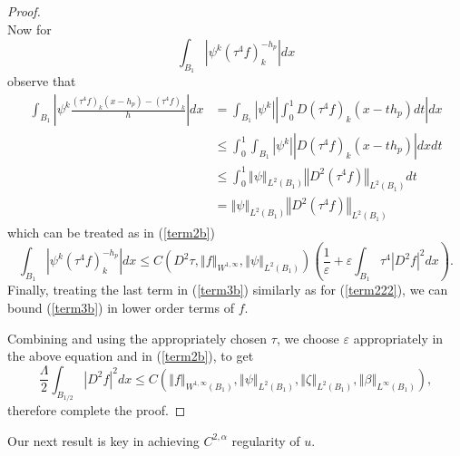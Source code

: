 \documentclass[12pt,leqno]{amsart}%
\theoremstyle{plain}
\numberwithin{equation}{section}
\theoremstyle{definition}
\begin{document}
\begin{proof}
\begin{equation}
\end{equation}
Now for
\begin{equation}
\int_{B_{1}}\left\vert \psi^{k} \left(  \tau^{4}f\right)  _{k}^{-h_{p}%
}\right\vert dx \label{term222}%
\end{equation}
observe that
\begin{align*}
\int_{B_{1}}\left|  \psi^{k}\frac{\left(  \tau^{4}f\right)  _{k}%
(x-h_{p})-\left(  \tau^{4}f\right)  _{k}}{h}\right|  dx  &  =\int_{B_{1}%
}\left|  \psi^{k}\right|  \left|  \int_{0}^{1}D\left(  \tau^{4}f\right)
_{k}(x-th_{p})dt\right|  dx\\
&  \leq\int_{0}^{1}\int_{B_{1}}\left|  \psi^{k}\right|  \left|  D \left(
\tau^{4}f\right)  _{k} (x-th_{p})\right|  dxdt\\
&  \leq\int_{0}^{1}\left\Vert \psi\right\Vert _{L^{2}(B_{1})}\left\Vert
D^{2}\left(  \tau^{4}f\right)  \right\Vert _{L^{2}(B_{1})}dt\\
&  =\left\Vert \psi\right\Vert _{L^{2}(B_{1})}\left\Vert D^{2}\left(  \tau
^{4}f\right)  \right\Vert _{L^{2}(B_{1})}%
\end{align*}
which can be treated as in (\ref{term2b})%
\[
\int_{B_{1}}\left\vert \psi^{k} \left(  \tau^{4}f\right)  _{k}^{-h_{p}%
}\right\vert dx\leq C\left(  D^{2}\tau,\left\Vert f\right\Vert _{W^{1,\infty}%
},\left\Vert \psi\right\Vert _{L^{2}(B_{1})}\right)  \left(  \frac
{1}{\varepsilon}+\varepsilon\int_{B_{1}}\tau^{4}\left\vert D^{2}f\right\vert
^{2}dx\right)  .
\]
Finally, treating the last term in (\ref{term3b}) similarly as for
(\ref{term222}), we can bound (\ref{term3b}) in lower order terms of $f.$

Combining and using the appropriately chosen $\tau$, we choose $\varepsilon$
appropriately in the above equation and in (\ref{term2b}), to get
\[
\frac{\Lambda}{2}\int_{B_{1/2}}\left\vert D^{2}f\right\vert ^{2}dx\leq
C\left(  \left\Vert f\right\Vert _{W^{1,\infty}(B_{1})},\left\Vert
\psi\right\Vert _{L^{2}(B_{1})},\left\Vert \zeta\right\Vert _{L^{2}(B_{1}%
)},\left\Vert \beta\right\Vert _{L^{\infty}(B_{1})}\right)  ,
\]
therefore complete the proof.
\end{proof}

Our next result is key in achieving $C^{2,\alpha}$ regularity of $u$.

\end{document}
